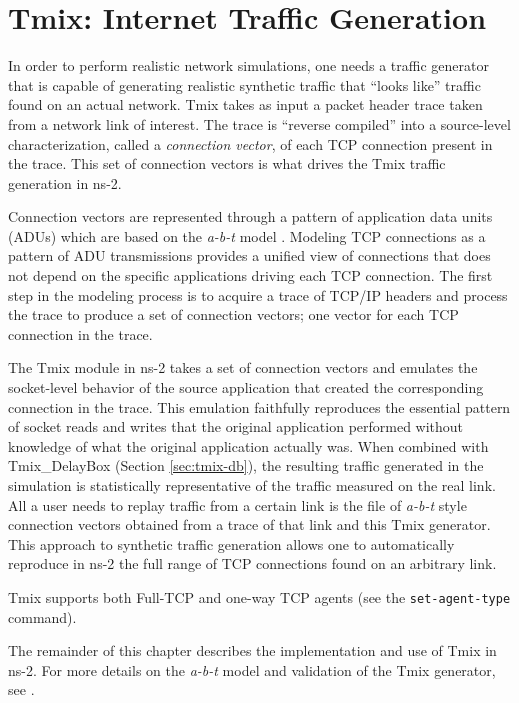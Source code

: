 %

\chapter{Tmix: Internet Traffic Generation}
\label{chap:tmix}

In order to perform realistic network simulations, one needs a traffic generator that is capable of generating realistic synthetic traffic that ``looks like'' traffic found on an actual network. Tmix takes as input a packet header trace taken from a network link of interest. The trace is ``reverse compiled'' into a source-level characterization, called a \emph{connection vector}, of each TCP connection present in the trace.  This set of connection vectors is what drives the Tmix traffic generation in ns-2.  

Connection vectors are represented through a pattern of application data units (ADUs) which are based on the \emph{a-b-t} model \cite{weigle-ccr06}.  Modeling TCP connections as a pattern of ADU transmissions provides a unified view of connections that does not depend on the specific applications driving each TCP connection.  The first step in the modeling process is to acquire a trace of TCP/IP headers and process the trace to produce a set of connection vectors; one vector for each TCP connection in the trace.

The Tmix module in ns-2 takes a set of connection vectors and emulates the socket-level behavior of the source application that created the corresponding connection in the trace. This emulation faithfully reproduces the essential pattern of socket reads and writes that the original application performed without knowledge of what the original application actually was. When combined with Tmix\_DelayBox (Section \ref{sec:tmix-db}), the resulting traffic generated in the simulation is statistically representative of the traffic measured on the real link. All a user needs to replay traffic from a certain link is the file of \emph{a-b-t} style connection vectors obtained from a trace of that link and this Tmix generator. This approach to synthetic traffic generation allows one to automatically reproduce in ns-2 the full range of TCP connections found on an arbitrary link.

Tmix supports both Full-TCP and one-way TCP agents (see the {\tt set-agent-type} command).

The remainder of this chapter describes the implementation and use of Tmix in ns-2.  For more details on the \emph{a-b-t} model and validation of the Tmix generator, see \cite{weigle-ccr06}.

